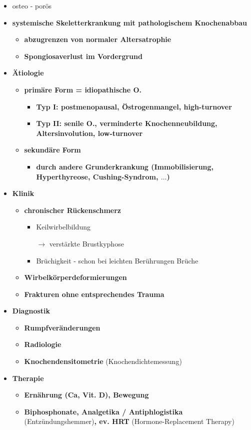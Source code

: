 	\begin{itemize}
		\item osteo - porös
		\item \textbf{systemische Skeletterkrankung mit pathologischem Knochenabbau}
			\begin{itemize}
				\item \textbf{abzugrenzen von normaler Altersatrophie}
				\item \textbf{Spongiosaverlust im Vordergrund}
			\end{itemize}
		\item \textbf{Ätiologie}
			\begin{itemize}
				\item \textbf{primäre Form = idiopathische O.}
					\begin{itemize}
						\item \textbf{Typ I: postmenopausal, Östrogenmangel, high-turnover}
						\item \textbf{Typ II: senile O., verminderte Knochenneubildung, Altersinvolution, low-turnover}
					\end{itemize}
				\item \textbf{sekundäre Form}
					\begin{itemize}
						\item \textbf{durch andere Grunderkrankung (Immobilisierung, Hyperthyreose, Cushing-Syndrom, $\dots$)}
					\end{itemize}
			\end{itemize}
		\item \textbf{Klinik}
			\begin{itemize}
				\item \textbf{chronischer Rückenschmerz}
					\begin{itemize}
						\item Keilwirbelbildung
						\item[$\rightarrow$] verstärkte Brustkyphose
						\item Brüchigkeit - schon bei leichten Berührungen Brüche
					\end{itemize}
				\item \textbf{Wirbelkörperdeformierungen}
				\item \textbf{Frakturen ohne entsprechendes Trauma}
			\end{itemize}
		\item \textbf{Diagnostik}
			\begin{itemize}
				\item \textbf{Rumpfveränderungen}
				\item \textbf{Radiologie}
				\item \textbf{Knochendensitometrie} (Knochendichtemessung)
			\end{itemize}
		\item \textbf{Therapie}
			\begin{itemize}
				\item \textbf{Ernährung (Ca, Vit. D), Bewegung}
				\item \textbf{Biphosphonate, Analgetika / Antiphlogistika} (Entzündungshemmer)\textbf{, ev. HRT} (Hormone-Replacement Therapy)
			\end{itemize}
 	\end{itemize}

